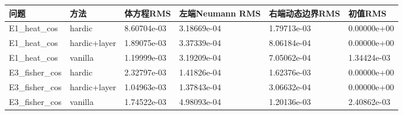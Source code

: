 \documentclass[11pt,a4paper]{article}
\newcounter{none}
\begin{document}
{\def\LTcaptype{none} %
\begin{longtable}[]{@{}
  >{\raggedright\arraybackslash}p{}
  >{\raggedright\arraybackslash}p{}
  >{\raggedleft\arraybackslash}p{}
  >{\raggedleft\arraybackslash}p{}
  >{\raggedleft\arraybackslash}p{}
  >{\raggedleft\arraybackslash}p{}@{}}
\toprule\noalign{}
\begin{minipage}[b]{\linewidth}\raggedright
问题
\end{minipage} & \begin{minipage}[b]{\linewidth}\raggedright
方法
\end{minipage} & \begin{minipage}[b]{\linewidth}\raggedleft
体方程RMS
\end{minipage} & \begin{minipage}[b]{\linewidth}\raggedleft
左端Neumann RMS
\end{minipage} & \begin{minipage}[b]{\linewidth}\raggedleft
右端动态边界RMS
\end{minipage} & \begin{minipage}[b]{\linewidth}\raggedleft
初值RMS
\end{minipage} \\
\midrule\noalign{}
\endhead
\bottomrule\noalign{}
\endlastfoot
E1\_\allowbreak{}heat\_\allowbreak{}cos & hardic & 8.60704e-03 & 3.18669e-04 & 1.79713e-03 & 0.00000e+00 \\
E1\_\allowbreak{}heat\_\allowbreak{}cos & hardic+\allowbreak{}layer & 1.89075e-03 & 3.37339e-04 & 8.06184e-04 & 0.00000e+00 \\
E1\_\allowbreak{}heat\_\allowbreak{}cos & vanilla & 1.19999e-03 & 3.19209e-04 & 7.05062e-04 & 1.34424e-03 \\
E3\_\allowbreak{}fisher\_\allowbreak{}cos & hardic & 2.32797e-03 & 1.41826e-04 & 1.62376e-03 & 0.00000e+00 \\
E3\_\allowbreak{}fisher\_\allowbreak{}cos & hardic+\allowbreak{}layer & 1.04963e-03 & 1.37843e-04 & 3.06632e-04 & 0.00000e+00 \\
E3\_\allowbreak{}fisher\_\allowbreak{}cos & vanilla & 1.74522e-03 & 4.98093e-04 & 1.20136e-03 & 2.40862e-03 \\
\end{longtable}
}
\end{document}

